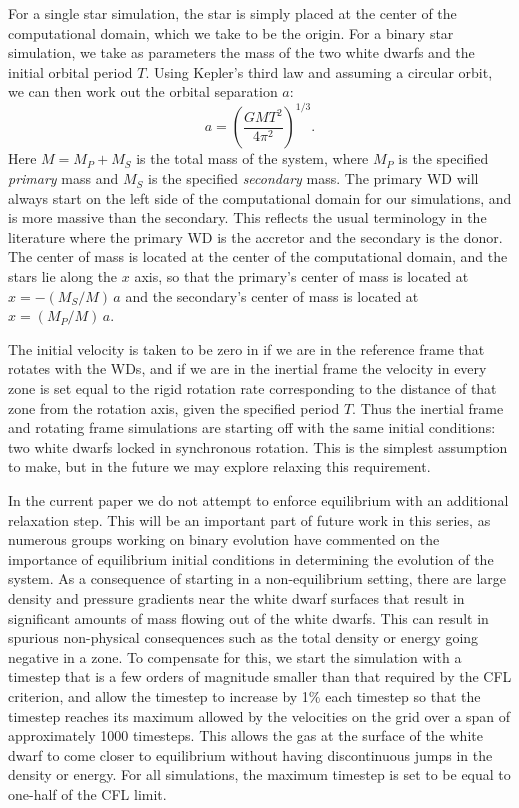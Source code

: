 \documentclass[iop]{../emulateapj}
\begin{document}
For a single star simulation, the star is simply placed at the center
of the computational domain, which we take to be the origin. For a
binary star simulation, we take as parameters the mass of the two
white dwarfs and the initial orbital period $T$. Using Kepler's third
law and assuming a circular orbit, we can then work out the orbital
separation $a$:
\begin{equation}
  a = \left(\frac{GM T^2}{4\pi^2}\right)^{1/3}.
\end{equation}
Here $M = M_P + M_S$ is the total mass of the system, where $M_P$ is
the specified \textit{primary} mass and $M_S$ is the specified
\textit{secondary} mass. The primary WD will always start on the left
side of the computational domain for our simulations, and is more
massive than the secondary. This reflects the usual terminology in the
literature where the primary WD is the accretor and the secondary is
the donor. The center of mass is located at the center of the
computational domain, and the stars lie along the $x$ axis, so that
the primary's center of mass is located at $x = -(M_S / M)\, a$ and
the secondary's center of mass is located at $x = (M_P / M)\, a$.

The initial velocity is taken to be zero in if we are in the reference
frame that rotates with the WDs, and if we are in the inertial frame
the velocity in every zone is set equal to the rigid rotation rate 
corresponding to the distance of that zone from the rotation axis, given
the specified period $T$. Thus the inertial frame and rotating frame 
simulations are starting off with the same initial conditions: two white 
dwarfs locked in synchronous rotation. This is the simplest assumption to 
make, but in the future we may explore relaxing this requirement.

In the current paper we do not attempt to enforce equilibrium with an additional relaxation
step. This will be an important part of future work in this series, as
numerous groups working on binary evolution
\citep{swc:2000,motl:2002,rosswog:2004,dan:2011,pakmor:2012:gadget}
have commented on the importance of equilibrium initial conditions in
determining the evolution of the system. As a consequence of starting 
in a non-equilibrium setting, there are 
large density and pressure gradients near the white dwarf surfaces
that result in significant amounts of mass flowing out of the white dwarfs.
This can result in spurious non-physical consequences such as 
the total density or energy going negative in a zone. To compensate 
for this, we start the simulation with a timestep that is a few orders 
of magnitude smaller than that required by the CFL criterion, and allow
the timestep to increase by 1\% each timestep so that the timestep reaches 
its maximum allowed by the velocities on the grid over a span of approximately 
1000 timesteps. This allows the gas at the surface of the white dwarf
to come closer to equilibrium without having 
discontinuous jumps in the density or energy. For all simulations, 
the maximum timestep is set to be equal to one-half of the CFL limit.
\end{document}
